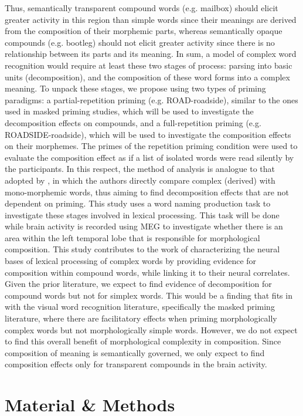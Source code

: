 \documentclass{frontiersSCNS}
\begin{document}
    Thus, semantically transparent compound words (e.g. mailbox) should elicit greater activity in this region than simple words since their meanings are derived from the composition of their morphemic parts, whereas semantically opaque compounds (e.g. bootleg) should not elicit greater activity since there is no relationship between its parts and its meaning. In sum, a model of complex word recognition would require at least these two stages of process: parsing into basic units (decomposition), and the composition of these word forms into a complex meaning. To unpack these stages, we propose using two types of priming paradigms: a partial-repetition priming (e.g. ROAD-roadside), similar to the ones used in masked priming studies, which will be used to investigate the decomposition effects on compounds, and a full-repetition priming (e.g. ROADSIDE-roadside), which will be used to investigate the composition effects on their morphemes. The primes of the repetition priming condition were used to evaluate the composition effect as if a list of isolated words were read silently by the participants. In this respect, the method of analysis is analogue to that adopted by \citet*{Zweig:2009}, in which the authors directly compare complex (derived) with mono-morphemic words, thus aiming to find decomposition effects that are not dependent on priming. This study uses a word naming production task to investigate these stages involved in lexical processing. This task will be done while brain activity is recorded using MEG to investigate whether there is an area within the left temporal lobe that is responsible for morphological composition. This study contributes to the work of characterizing the neural bases of lexical processing of complex words by providing evidence for composition within compound words, while linking it to their neural correlates. Given the prior literature, we expect to find evidence of decomposition for compound words but not for simplex words. This would be a finding that fits in with the visual word recognition literature, specifically the masked priming literature, where there are facilitatory effects when priming morphologically complex words but not morphologically simple words. However, we do not expect to find this overall benefit of morphological complexity in composition. Since composition of meaning is semantically governed, we only expect to find composition effects only for transparent compounds in the brain activity. 

\section{Material \& Methods}
\end{document}
